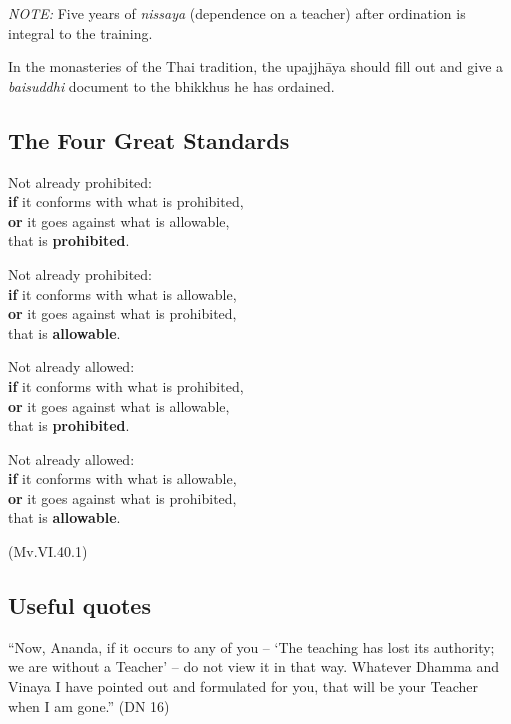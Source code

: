 
\emph{NOTE:} Five years of \emph{nissaya} (dependence on a teacher)
after ordination is integral to the training.

In the monasteries of the Thai tradition, the upajjhāya should fill out
and give a \emph{baisuddhi} document to the bhikkhus he has ordained.

\subsection{The Four Great Standards}

\begin{multicols}{2}

Not already prohibited:\\
\textbf{if} it conforms with what is prohibited,\\
\textbf{or} it goes against what is allowable,\\
that is \textbf{prohibited}.

Not already prohibited:\\
\textbf{if} it conforms with what is allowable,\\
\textbf{or} it goes against what is prohibited,\\
that is \textbf{allowable}.

\columnbreak

Not already allowed:\\
\textbf{if} it conforms with what is prohibited,\\
\textbf{or} it goes against what is allowable,\\
that is \textbf{prohibited}.

Not already allowed:\\
\textbf{if} it conforms with what is allowable,\\
\textbf{or} it goes against what is prohibited,\\
that is \textbf{allowable}.

\end{multicols}

(Mv.VI.40.1)

\clearpage

\subsection{Useful quotes}

``Now, Ananda, if it occurs to any of you -- `The teaching has lost its
authority; we are without a Teacher' -- do not view it in that way.
Whatever Dhamma and Vinaya I have pointed out and formulated for you,
that will be your Teacher when I am gone.'' (DN 16)

